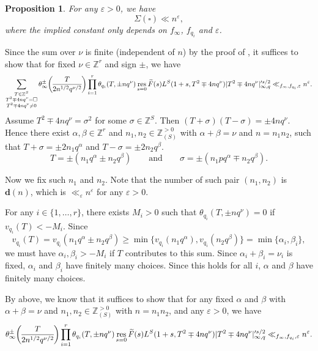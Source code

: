 \documentclass[10pt,oneside,reqno]{amsart}
\makeatletter
\newcommand\ZZ{\mathbb{Z}}
\DeclareMathOperator\res{res}
\renewcommand\geq{\geqslant}
\newcommand\legendresymbol[2]{\genfrac{(}{)}{}{}{#1}{#2}}
\theoremstyle{THEOREM}
\newtheorem{proposition}[theorem]{Proposition}
\theoremstyle{DEFINITION}
\theoremstyle{EXERCISE}
\numberwithin{equation}{section}
\renewenvironment{proof}[1][\proofname]{\par
  \vspace{-6pt}
  \pushQED{\qed}
  \normalfont \topsep6\p@\@plus6\p@\relax
  \trivlist
  \item[\hskip\labelsep\rmfamily\bfseries
    #1\@addpunct{:}]\ignorespaces
}{
  \popQED\endtrivlist\@endpefalse
  \vspace{-6pt}
}
\makeatother
\begin{document}
\begin{proposition}\label{prop:estimatesigmasquare}
For any $\varepsilon>0$, we have
\[
\Sigma(\square)\ll n^\varepsilon,
\]
where the implied constant only depends on $f_\infty$, $f_{q_i}$ and $\varepsilon$.
\end{proposition}
\begin{proof}
Since the sum over $\nu$ is finite (independent of $n$) by the proof of  \cite[Theorem 2.13]{cheng2025}, it suffices to show that for fixed $\nu\in \ZZ^r$ and sign $\pm$, we have
\[
\sum_{\substack{T\in \ZZ^S\\ T^2\mp 4nq^\nu= \square\\ T^2\mp 4nq^\nu\neq 0}}\theta_\infty^\pm\legendresymbol{T}{2n^{1/2}q^{\nu/2}}\\
    \prod_{i=1}^{r}\theta_{q_i}(T,\pm nq^\nu)\res_{s=0}\widetilde{F}(s)L^{S}(1+s,T^2\mp 4nq^\nu)|T^2\mp 4nq^\nu|_{\infty,q}'^{s/2}\ll_{f_\infty,f_{q_i},\varepsilon} n^\varepsilon.
\]
Assume $T^2\mp 4nq^\nu=\sigma^2$ for some $\sigma\in \ZZ^S$. Then $(T+\sigma)(T-\sigma)=\pm 4nq^\nu$. Hence there exist $\alpha,\beta\in \ZZ^r$ and $n_1,n_2\in \ZZ_{(S)}^{>0}$ with $\alpha+\beta=\nu$ and $n=n_1n_2$, such that $T+\sigma=\pm 2n_1q^{\alpha}$ and $T-\sigma=\pm 2n_2q^{\beta}$.
\[
T=\pm(n_1q^\alpha \pm n_2q^\beta)\qquad\text{and}\qquad \sigma=\pm(n_1pq^\alpha \mp n_2q^\beta).
\]

Now we fix such $n_1$ and $n_2$. Note that the number of such pair $(n_1,n_2)$ is $\bm{d}(n)$, which is $\ll_\varepsilon n^\varepsilon$ for any $\varepsilon>0$.

For any $i\in \{1,\dots,r\}$, there exists $M_i>0$ such that $\theta_{q_i}(T,\pm nq^\nu)=0$ if $v_{q_i}(T)<-M_i$. Since 
\[
v_{q_i}(T)=v_{q_i}(n_1q^\alpha \pm n_2q^\beta)\geq \min\{v_{q_i}(n_1q^\alpha) ,v_{q_i}(n_2q^\beta)\}=\min\{\alpha_i,\beta_i\},
\]
we must have $\alpha_i,\beta_i>-M_i$ if $T$ contributes to this sum. Since $\alpha_i+\beta_i=\nu_i$ is fixed, $\alpha_i$ and $\beta_i$ have finitely many choices. Since this holds for all $i$, $\alpha$ and $\beta$ have finitely many choices. 

By above, we know that it suffices to show that for any fixed $\alpha$ and $\beta$ with $\alpha+\beta=\nu$ and $n_1,n_2\in \ZZ_{(S)}^{>0}$ with $n=n_1n_2$, and any $\varepsilon>0$, we have
 \[
\theta_\infty^\pm\legendresymbol{T}{2n^{1/2}q^{\nu/2}}\\
    \prod_{i=1}^{r}\theta_{q_i}(T,\pm nq^\nu)\res_{s=0}\widetilde{F}(s)L^{S}(1+s,T^2\mp 4nq^\nu)|T^2\mp 4nq^\nu|_{\infty,q}'^{s/2}\ll_{f_\infty,f_{q_i},\varepsilon} n^\varepsilon.
\]


\end{proof}
\end{document}
